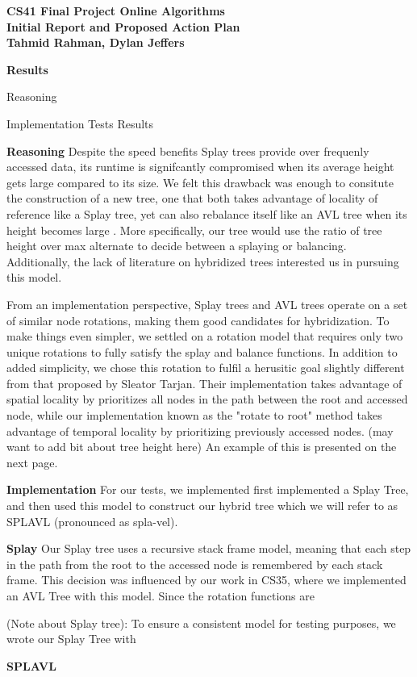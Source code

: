 \documentclass[11pt]{article}
\begin{document}
\begin{center}
{\Large \textbf{CS41 Final Project Online Algorithms}}\\
{\large \textbf{Initial Report and Proposed Action Plan}} \\
\textbf{Tahmid Rahman, Dylan Jeffers}
\end{center}
\vspace{ 4 mm} 

{\textbf{Results}}

\vspace{2mm}

Reasoning

Implementation
Tests
Results

\textbf{Reasoning}
\vspace{2mm}
Despite the speed benefits Splay trees provide over frequenly accessed data, its 
runtime is signifcantly compromised when its average height gets large compared to
its size.
We felt this drawback was enough to consitute the construction
of a new tree, one that both takes advantage of locality of reference like a Splay
tree, yet can also rebalance itself like an AVL tree when its height becomes large
. More specifically, our tree would use the ratio of tree height over max alternate
to decide between a splaying or balancing. Additionally, the lack of literature on
hybridized trees interested us in pursuing this model.

From an implementation perspective, Splay trees and AVL trees operate on a set of
similar node rotations, making them good candidates for hybridization. To make things
even simpler, we settled on a rotation model that requires only two unique rotations
to fully satisfy the splay and balance functions. In addition to added simplicity,
we chose this rotation to fulfil a herusitic goal slightly different from that 
proposed by Sleator Tarjan. Their implementation takes advantage of spatial locality 
by prioritizes all nodes in the path between the root and accessed node, while our
implementation known as the "rotate to root" method takes advantage of temporal locality by
prioritizing previously accessed nodes. (may want to add bit about tree height here)
An example of this is presented on the next page.

\textbf{Implementation}
For our tests, we implemented first implemented a Splay Tree, and then used this
model to construct our hybrid tree which we will refer to as SPLAVL (pronounced as spla-vel). 

\textbf{Splay}
Our Splay tree uses a recursive stack frame model, meaning 
that each step in the path from the root to the accessed node is remembered by 
each stack frame. This decision was influenced by our work in CS35, where we
implemented an AVL Tree with this model. Since the rotation functions are 

(Note about Splay tree): To ensure a consistent model for testing purposes, we 
wrote our Splay Tree with


\textbf{SPLAVL}
\end{document}
